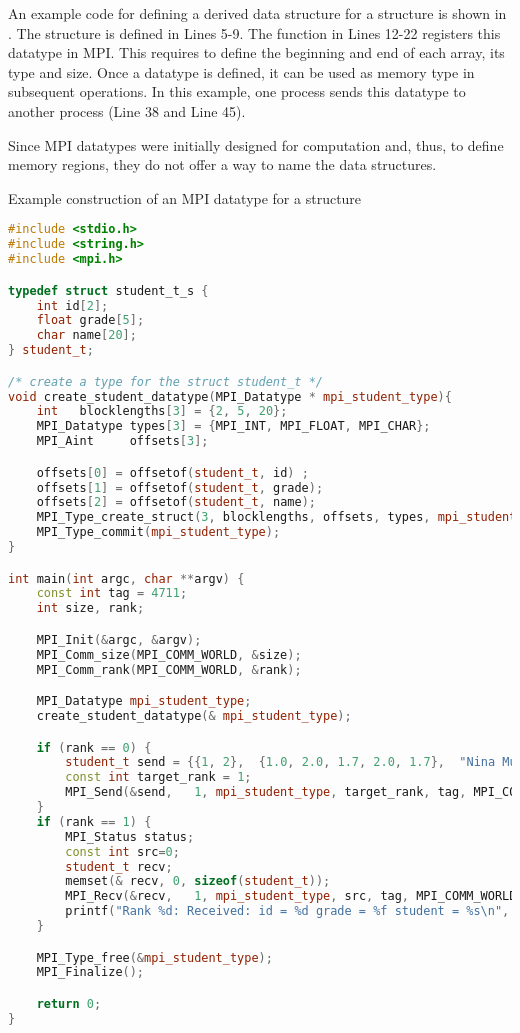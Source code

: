 An example code for defining a derived data structure for a structure is shown in .
The structure is defined in Lines 5-9.
The function in Lines 12-22 registers this datatype in MPI.
This requires to define the beginning and end of each array, its type and size.
Once a datatype is defined, it can be used as memory type in subsequent operations.
In this example, one process sends this datatype to another process (Line 38 and Line 45).

Since MPI datatypes were initially designed for computation and, thus, to define memory regions, they do not offer a way to name the data structures.

\begin{tcbcode}[label={lst:mpi-struct}]{Example construction of an MPI datatype for a structure}
\begin{lstlisting}[language=c++,morekeywords={{student_t}}]
#include <stdio.h>
#include <string.h>
#include <mpi.h>

typedef struct student_t_s {
    int id[2];
    float grade[5];
    char name[20];
} student_t;

/* create a type for the struct student_t */
void create_student_datatype(MPI_Datatype * mpi_student_type){
    int   blocklengths[3] = {2, 5, 20};
    MPI_Datatype types[3] = {MPI_INT, MPI_FLOAT, MPI_CHAR};
    MPI_Aint     offsets[3];

    offsets[0] = offsetof(student_t, id) ;
    offsets[1] = offsetof(student_t, grade);
    offsets[2] = offsetof(student_t, name);
    MPI_Type_create_struct(3, blocklengths, offsets, types, mpi_student_type);
    MPI_Type_commit(mpi_student_type);
}

int main(int argc, char **argv) {
    const int tag = 4711;
    int size, rank;

    MPI_Init(&argc, &argv);
    MPI_Comm_size(MPI_COMM_WORLD, &size);
    MPI_Comm_rank(MPI_COMM_WORLD, &rank);

    MPI_Datatype mpi_student_type;
    create_student_datatype(& mpi_student_type);

    if (rank == 0) {
        student_t send = {{1, 2},  {1.0, 2.0, 1.7, 2.0, 1.7},  "Nina Musterfrau"};
        const int target_rank = 1;
        MPI_Send(&send,   1, mpi_student_type, target_rank, tag, MPI_COMM_WORLD);
    }
    if (rank == 1) {
        MPI_Status status;
        const int src=0;
        student_t recv;
        memset(& recv, 0, sizeof(student_t));
        MPI_Recv(&recv,   1, mpi_student_type, src, tag, MPI_COMM_WORLD, &status);
        printf("Rank %d: Received: id = %d grade = %f student = %s\n", rank, recv.id[0], recv.grade[0], recv.name);
    }

    MPI_Type_free(&mpi_student_type);
    MPI_Finalize();

    return 0;
}
\end{lstlisting}
\end{tcbcode}



